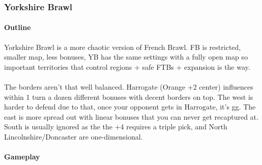 \subsubsection{Yorkshire Brawl}

\paragraph{Outline}

Yorkshire Brawl is a more chaotic version of French Brawl. FB is restricted, smaller map, less bonuses, YB has the same settings with a fully open map so important territories that control regions + safe FTBs + expansion is the way.
\\
\\
The borders aren't that well balanced. Harrogate (Orange +2 center) influences within 1 turn a dozen different bonuses with decent borders on top. The west is harder to defend due to that, once your opponent gets in Harrogate, it's gg. The east is more spread out with linear bonuses that you can never get recaptured at. South is usually ignored as the the +4 requires a triple pick, and North Lincolnshire/Doncaster are one-dimensional.

\paragraph{Gameplay}


